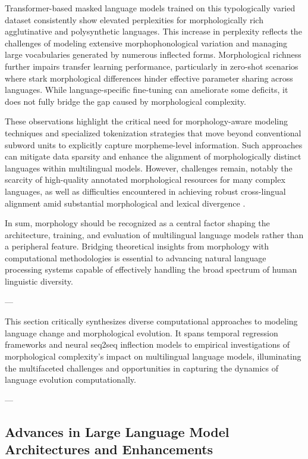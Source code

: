 Transformer-based masked language models trained on this typologically varied dataset consistently show elevated perplexities for morphologically rich agglutinative and polysynthetic languages. This increase in perplexity reflects the challenges of modeling extensive morphophonological variation and managing large vocabularies generated by numerous inflected forms. Morphological richness further impairs transfer learning performance, particularly in zero-shot scenarios where stark morphological differences hinder effective parameter sharing across languages. While language-specific fine-tuning can ameliorate some deficits, it does not fully bridge the gap caused by morphological complexity.

These observations highlight the critical need for morphology-aware modeling techniques and specialized tokenization strategies that move beyond conventional subword units to explicitly capture morpheme-level information. Such approaches can mitigate data sparsity and enhance the alignment of morphologically distinct languages within multilingual models. However, challenges remain, notably the scarcity of high-quality annotated morphological resources for many complex languages, as well as difficulties encountered in achieving robust cross-lingual alignment amid substantial morphological and lexical divergence \cite{ref34}.

In sum, morphology should be recognized as a central factor shaping the architecture, training, and evaluation of multilingual language models rather than a peripheral feature. Bridging theoretical insights from morphology with computational methodologies is essential to advancing natural language processing systems capable of effectively handling the broad spectrum of human linguistic diversity.

---

This section critically synthesizes diverse computational approaches to modeling language change and morphological evolution. It spans temporal regression frameworks and neural seq2seq inflection models to empirical investigations of morphological complexity’s impact on multilingual language models, illuminating the multifaceted challenges and opportunities in capturing the dynamics of language evolution computationally.

---

\subsection{Advances in Large Language Model Architectures and Enhancements}

